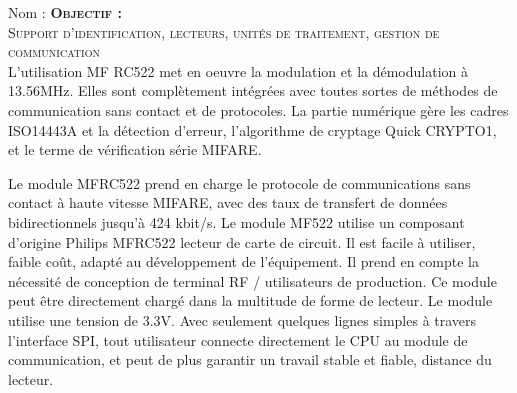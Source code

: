 \documentclass[a4paper, 11pt]{article}           %
\newcounter{Q}
\newcommand{\objectif}[1]{\textsc{\huge \textbf{Objectif :}\\[2mm] #1} }
\begin{document}
\sffamily
\hfill Nom : {\noindent\makebox[5cm]{\dotfill}\endgraf}
\objectif{Support d'identification, lecteurs, unités de traitement, gestion de communication}\\


L'utilisation MF RC522 met en oeuvre la modulation et la démodulation à 13.56MHz. Elles sont complètement intégrées avec toutes sortes de méthodes de communication sans contact et de protocoles. La partie numérique gère les cadres ISO14443A et la détection d'erreur, l'algorithme de cryptage Quick CRYPTO1, et le terme de vérification série MIFARE.

Le module MFRC522 prend en charge le protocole  de communications sans contact à haute vitesse MIFARE, avec des taux de transfert de données bidirectionnels jusqu'à 424 kbit/s. Le module MF522 utilise un composant d'origine Philips MFRC522 lecteur de carte de circuit. Il est facile à utiliser, faible coût, adapté au développement de l'équipement. Il prend en compte la nécessité de conception de terminal RF / utilisateurs de production. Ce module peut être directement chargé dans la multitude de forme de lecteur. Le module utilise une tension de 3.3V. Avec seulement quelques lignes simples à travers l'interface SPI, tout utilisateur connecte directement le CPU au module de communication, et peut de plus garantir un travail stable et fiable, distance du lecteur.\\
\end{document}
